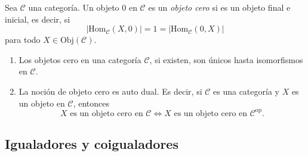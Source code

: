 \documentclass[tesis]{subfiles}
\begin{document}
%

\begin{Def}\label{Def: Objeto cero}
    Sea $\mathscr{C}$ una categoría. Un objeto $0$ en $\mathscr{C}$ es un \emph{objeto cero} si es un objeto final e inicial, es decir, si
    \[
    |\text{Hom}_\mathscr{C}(X,0)| = 1 = |\text{Hom}_\mathscr{C}(0,X)|
    \] 
    para todo $X\in\text{Obj}(\mathscr{C})$.
\end{Def}

\begin{Obs}\label{Obs: Objeto cero}\leavevmode

    \begin{enumerate}[label=(\arabic*)]
    
        \item Los objetos cero en una categoría $\mathscr{C}$, si existen, son únicos hasta isomorfismos en $\mathscr{C}$.

        \item La noción de objeto cero es auto dual. Es decir, si $\mathscr{C}$ es una categoría y $X$ es un objeto en $\mathscr{C}$, entonces
            \[
            X \text{ es un objeto cero en } \mathscr{C} \iff X \text{ es un objeto cero en } \mathscr{C}^\text{op}.
            \] 
    \end{enumerate}
\end{Obs}

\subsection*{Igualadores y coigualadores} \label{Ssec: Igualadores y coigualadores}
\end{document}
